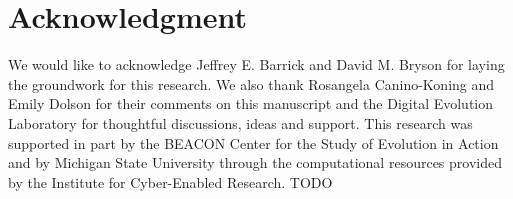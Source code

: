 \section*{Acknowledgment}

We would like to acknowledge Jeffrey E. Barrick and David M. Bryson for laying the groundwork for this research. We also thank Rosangela Canino-Koning and Emily Dolson for their comments on this manuscript and the Digital Evolution Laboratory for thoughtful discussions, ideas and support. This research was supported in part by the BEACON Center for the Study of Evolution in Action and by Michigan State University through the computational resources provided by the Institute for Cyber-Enabled Research.
TODO